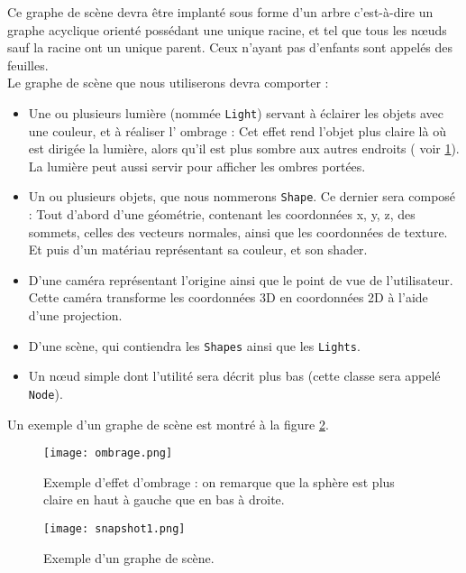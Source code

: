 \documentclass[11pt]{report}
\begin{document}
Ce graphe de scène devra être implanté sous forme d'un arbre c'est-à-dire un graphe acyclique orienté possédant une unique racine, et tel que tous les nœuds sauf la racine ont un unique parent. Ceux n'ayant pas d'enfants sont appelés des feuilles. \\

Le graphe de scène que nous utiliserons devra comporter : 
\begin{itemize}
\item Une ou plusieurs lumière (nommée \texttt{Light}) servant à éclairer les objets avec une couleur, et à réaliser l' ombrage : Cet effet rend l'objet plus claire là où est dirigée la lumière, alors qu'il est plus sombre aux autres endroits ( voir \ref{ombrage}). La lumière peut aussi servir pour afficher les ombres portées.
\item Un ou plusieurs objets, que nous nommerons \texttt{Shape}. Ce dernier sera composé : Tout d'abord d'une géométrie, contenant les coordonnées x, y, z, des sommets, celles des vecteurs normales, ainsi que les coordonnées de texture. Et puis d'un matériau représentant sa couleur, et son shader. %
\item D'une caméra représentant l'origine ainsi que le point de vue de l'utilisateur. Cette caméra transforme les coordonnées 3D en coordonnées 2D à l'aide d'une projection.
\item D'une scène, qui contiendra les \texttt{Shapes} ainsi que les \texttt{Lights}.
\item Un nœud simple dont l'utilité sera décrit plus bas (cette classe sera appelé \texttt{Node}).
\end{itemize}



Un exemple d'un graphe de scène est montré à la figure \ref{graphscene}.
\begin{figure}[h!]
  \caption{Exemple d'effet d'ombrage : on remarque que la sphère est plus claire en haut à gauche que en bas à droite.}
  \centering
\texttt{[image: ombrage.png]} 
\label{ombrage}
\end{figure}

\begin{figure}[h!]
  \caption{Exemple d'un graphe de scène.}
  \centering
\texttt{[image: snapshot1.png]} 
\label{graphscene}
\end{figure}
\end{document}

